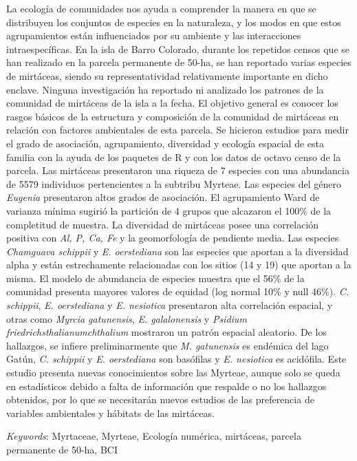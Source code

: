 \documentclass[11pt,]{article}
\renewenvironment{abstract}
 {{%
    \setlength{\leftmargin}{0mm}
    \setlength{\rightmargin}{\leftmargin}%
  }%
  \relax}
 {\endlist}
\begin{document}
\begin{abstract}

    \hbox{\vrule height .2pt width 39.14pc}

    \vskip 8.5pt %

\noindent La ecología de comunidades nos ayuda a comprender la manera en que se
distribuyen los conjuntos de especies en la naturaleza, y los modos en
que estos agrupamientos están influenciados por su ambiente y las
interacciones intraespecíficas. En la isla de Barro Colorado, durante
los repetidos censos que se han realizado en la parcela permanente de
50-ha, se han reportado varias especies de mirtáceas, siendo su
representatividad relativamente importante en dicho enclave. Ninguna
investigación ha reportado ni analizado los patrones de la comunidad de
mirtáceas de la isla a la fecha. El objetivo general es conocer los
rasgos básicos de la estructura y composición de la comunidad de
mirtáceas en relación con factores ambientales de esta parcela. Se
hicieron estudios para medir el grado de asociación, agrupamiento,
diversidad y ecología espacial de esta familia con la ayuda de los
paquetes de R y con los datos de octavo censo de la parcela. Las
mirtáceas presentaron una riqueza de 7 especies con una abundancia de
5579 individuos pertencientes a la subtribu Myrteae. Las especies del
género \emph{Eugenia} presentaron altos grados de asociación. El
agrupamiento Ward de varianza mínima sugirió la partición de 4 grupos
que alcazaron el 100\% de la completitud de muestra. La diversidad de
mirtáceas posee una correlación positiva con \emph{Al, P, Ca, Fe} y la
geomorfología de pendiente media. Las especies \emph{Chamguava schippii}
y \emph{E. oerstediana} son las especies que aportan a la diversidad
alpha y están estrechamente relacionadas con los sitios (14 y 19) que
aportan a la misma. El modelo de abundancia de especies muestra que el
56\% de la comunidad presenta mayores valores de equidad (log normal
10\% y null 46\%). \emph{C. schippii}, \emph{E. oerstediana} y \emph{E.
nesiotica} presentaron alta correlación espacial, y otras como
\emph{Myrcia gatunensis}, \emph{E. galalonensis} y \emph{Psidium
friedrichsthalianumchthalium} mostraron un patrón espacial aleatorio. De
los hallazgos, se infiere preliminarmente que \emph{M. gatunensis} es
endémica del lago Gatún, \emph{C. schippii} y \emph{E. oerstediana} son
basófilas y \emph{E. nesiotica} es acidófila. Este estudio presenta
nuevas conocimientos sobre las Myrteae, aunque solo se queda en
estadísticos debido a falta de información que respalde o no los
hallazgos obtenidos, por lo que se necesitarán nuevos estudios de las
preferencia de variables ambientales y hábitats de las mirtáceas.


\vskip 8.5pt \noindent \emph{Keywords}: Myrtaceae, Myrteae, Ecología numérica, mirtáceas, parcela permanente de
50-ha, BCI \par

    \hbox{\vrule height .2pt width 39.14pc}



\end{abstract}
\end{document}
